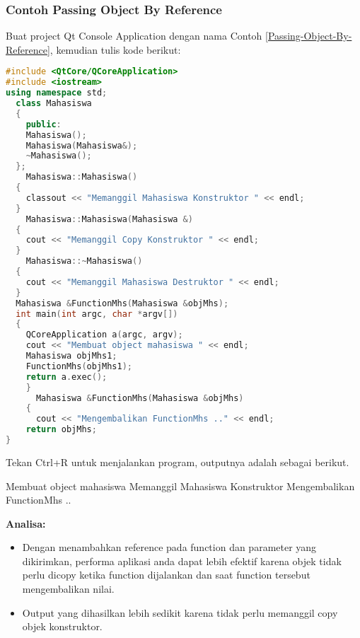 \subsubsection*{Contoh  Passing Object By Reference}

Buat project Qt Console Application dengan nama Contoh \ref{Passing-Object-By-Reference}, kemudian
tulis kode berikut:

\begin{lstlisting}[language=c++, caption=Passing Object By Reference, label=Passing-Object-By-Reference]
#include <QtCore/QCoreApplication>
#include <iostream>
using namespace std;
  class Mahasiswa
  {
    public:
    Mahasiswa();
    Mahasiswa(Mahasiswa&);
    ~Mahasiswa();
  };
    Mahasiswa::Mahasiswa()
  {
    classout << "Memanggil Mahasiswa Konstruktor " << endl;
  }
    Mahasiswa::Mahasiswa(Mahasiswa &)
  {
    cout << "Memanggil Copy Konstruktor " << endl;
  }
    Mahasiswa::~Mahasiswa()
  {
    cout << "Memanggil Mahasiswa Destruktor " << endl;
  }
  Mahasiswa &FunctionMhs(Mahasiswa &objMhs);
  int main(int argc, char *argv[])
  {
    QCoreApplication a(argc, argv);
    cout << "Membuat object mahasiswa " << endl;
    Mahasiswa objMhs1;
    FunctionMhs(objMhs1);
    return a.exec();
    }
      Mahasiswa &FunctionMhs(Mahasiswa &objMhs)
    {
      cout << "Mengembalikan FunctionMhs .." << endl;
    return objMhs;
}
\end{lstlisting}

Tekan Ctrl+R untuk menjalankan program, outputnya adalah sebagai
berikut.

\begin{lcverbatim}
Membuat object mahasiswa
Memanggil Mahasiswa Konstruktor
Mengembalikan FunctionMhs ..
\end{lcverbatim}

\textbf{Analisa:}

\begin{itemize}
\tightlist
\item
  Dengan menambahkan reference pada function dan parameter yang
  dikirimkan, performa aplikasi anda dapat lebih efektif karena objek
  tidak perlu dicopy ketika function dijalankan dan saat function
  tersebut mengembalikan nilai.
\item
  Output yang dihasilkan lebih sedikit karena tidak perlu memanggil copy
  objek konstruktor.
\end{itemize}

